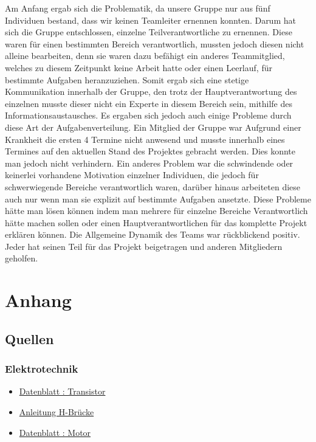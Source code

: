 \documentclass[notitlepage]{report}
\begin{document}
Am Anfang ergab sich die Problematik, da unsere Gruppe nur aus fünf Individuen bestand, dass wir keinen Teamleiter ernennen konnten. Darum hat sich die Gruppe entschlossen, einzelne Teilverantwortliche zu ernennen. Diese waren für einen bestimmten Bereich verantwortlich, mussten jedoch diesen nicht alleine bearbeiten, denn sie waren dazu befähigt ein anderes Teammitglied, welches zu diesem Zeitpunkt keine Arbeit hatte oder einen Leerlauf, für bestimmte Aufgaben heranzuziehen.
Somit ergab sich eine stetige Kommunikation innerhalb der Gruppe, den trotz der Hauptverantwortung des einzelnen musste dieser nicht ein Experte in diesem Bereich sein, mithilfe des Informationsaustausches.
Es ergaben sich jedoch auch einige Probleme durch diese Art der Aufgabenverteilung. Ein Mitglied der Gruppe war Aufgrund einer Krankheit die ersten 4 Termine nicht anwesend und musste innerhalb eines Termines auf den aktuellen Stand des Projektes gebracht werden. Dies konnte man jedoch nicht verhindern. Ein anderes Problem war die schwindende oder keinerlei vorhandene Motivation einzelner Individuen, die jedoch für schwerwiegende Bereiche verantwortlich waren, darüber hinaus arbeiteten diese auch nur wenn man sie explizit auf bestimmte Aufgaben ansetzte. 
Diese Probleme hätte man lösen können indem man mehrere für einzelne Bereiche Verantwortlich hätte machen sollen oder einen Hauptverantwortlichen für das komplette Projekt erklären können.
Die Allgemeine Dynamik des Teams war rückblickend positiv. Jeder hat seinen Teil für das Projekt beigetragen und anderen Mitgliedern geholfen.


\chapter{Anhang}


\section{Quellen}

\subsection{Elektrotechnik}
\begin{itemize}

\item \href{http://cdn-reichelt.de/documents/datenblatt/A100/BC546_48-CDIL.pdf}{Datenblatt : Transistor}


\item \href{http://anleitung.joy-it.net/wp-content/uploads/2017/06/SBC-MotoDriver2-Anleitung.pdf}{Anleitung H-Brücke}

\item \href{http://cdn-reichelt.de/documents/datenblatt/A300/COM_MOTOR_RAD_DB-DE.pdf}{Datenblatt : Motor}

\end{itemize}
\end{document}
